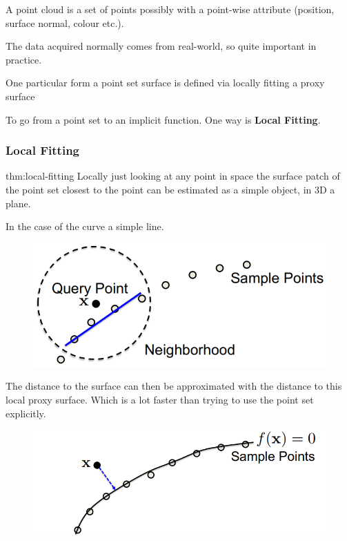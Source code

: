 \documentclass{article}
\begin{document}
A point cloud is a set of points possibly with a point-wise attribute (position, surface normal, colour etc.).

The data acquired normally comes from real-world, so quite important in practice.

One particular form a point set surface is defined via locally fitting a proxy surface


\vspace{20px}
To go from a point set to an implicit function. One way is \textbf{Local Fitting}.

\subsubsection{Local Fitting}

\begin{defin}{thm:local-fitting}
    Locally just looking at any point in space the surface patch of the point set closest to the point
    can be estimated as a simple object, in 3D a plane.
\end{defin}

In the case of the curve a simple line.

\begin{figure}[!ht]
    \centering
    \includegraphics[width=0.5\linewidth]{images/local_fitting.png}
\end{figure}

\vspace{10px}

The distance to the surface can then be approximated with the distance to this local proxy surface.
Which is a lot faster than trying to use the point set explicitly.

\begin{figure}[!ht]
    \centering
    \includegraphics[width=0.5\linewidth]{images/fully_fitted.png}
\end{figure}
\end{document}
